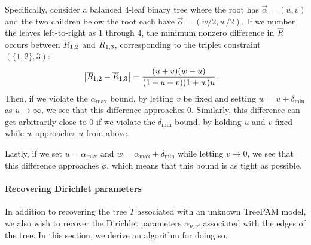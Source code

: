 \documentclass{article}
\theoremstyle{definition}
\newcommand{\deltaMin}{\delta_{\text{min}}}
\newcommand{\alphaMax}{\alpha_{\text{max}}}
\begin{document}
Specifically, consider a balanced 4-leaf binary tree where the root has $\vec\alpha = (u,v)$ and the two children below the root each have $\vec\alpha = (w/2,w/2)$.
If we number the leaves left-to-right as $1$ through $4$, the minimum nonzero difference in $\overline{R}$ occurs between $\overline{R}_{1,2}$ and $\overline{R}_{1,3}$, corresponding to the triplet constraint $(\{1,2\},3)$:
\begin{align*}
\left\lvert \overline{R}_{1,2} - \overline{R}_{1,3} \right\rvert
&=
\frac{ (u + v) (w-u) }{ (1 + u + v) (1 + w) u }.
\end{align*}
Then, if we violate the $\alphaMax$ bound, by letting $v$ be fixed and setting $w = u + \deltaMin$ as $u \to \infty$, we see that this difference approaches $0$.
Similarly, this difference can get arbitrarily close to $0$ if we violate the $\deltaMin$ bound, by holding $u$ and $v$ fixed while $w$ approaches $u$ from above.

Lastly, if we set $u = \alphaMax$ and $w = \alphaMax + \deltaMin$ while letting $v \to 0$, we see that this difference approaches $\phi$, which means that this bound is as tight as possible.


\paragraph{Recovering Dirichlet parameters}
In addition to recovering the tree $T$ associated with an unknown TreePAM model, we also wish to recover the Dirichlet parameters $\alpha_{\nu,\nu'}$ associated with the edges of the tree.
In this section, we derive an algorithm for doing so.
\end{document}

